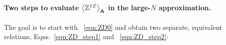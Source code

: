 

\paragraph{Two steps to evaluate $\Expected[\AMAT]{\ZD}$ in the large-$N$ approximation.}
The goal is to start with \EQN~\ref{eqn:ZD0} and obtain two separate, equivalent
relations, Eqns.~\ref{eqn:ZD_step1} and ~\ref{eqn:ZD_step2}:
